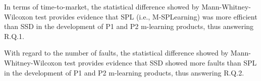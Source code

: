 \begin{table}[!ht]
\end{table}

In terms of time-to-market, the statistical difference showed by Mann-Whitney-Wilcoxon test provides evidence that SPL (i.e., M-SPLearning) was more efficient than SSD in the development of P1 and P2 m-learning products, thus answering R.Q.1.

With regard to the number of faults, the statistical difference showed by Mann-Whitney-Wilcoxon test provides evidence that SSD showed more faults than SPL in the development of P1 and P2 m-learning products, thus answering R.Q.2.

